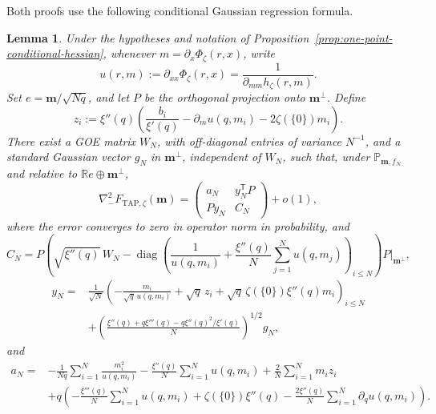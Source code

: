 \documentclass[a4paper,10pt,reqno]{amsart}
\numberwithin{equation}{section}
\newtheorem{lemma}[proposition]{Lemma}%
\newcommand{\dP}{\mathbb{P}}%
\newcommand{\TAP}{\mathrm{TAP}}
\newcommand{\bfm}{\mathbf{m}}
\begin{document}
	Both proofs use the following conditional Gaussian regression formula.
	
	\begin{lemma}
		\label{lem:one-point-gaussian-regression}
		Under the hypotheses and notation of
		Proposition~\ref{prop:one-point-conditional-hessian}, whenever
		\(m=\partial_x\Phi_\zeta(r,x)\), write
		\[
		u(r,m):=\partial_{xx}\Phi_\zeta(r,x)
		=\frac1{\partial_{mm}h_\zeta(r,m)}.
		\]
		Set \(e=\bfm/\sqrt{Nq}\), and let \(P\) be the orthogonal
		projection onto \(\bfm^\perp\). Define
		\[
		z_i
		:=
		\xi''(q)\left(
		\frac{b_i}{\xi'(q)}-\partial_m u(q,m_i)
		-2\zeta(\{0\})m_i
		\right).
		\]
		There exist a GOE matrix \(W_N\), with off-diagonal entries of
		variance \(N^{-1}\), and a standard Gaussian vector \(g_N\) in
		\(\bfm^\perp\), independent of \(W_N\), such that, under
		\(\dP_{\bfm,f_N}\) and relative to
		\(\mathbb R e\oplus\bfm^\perp\),
		\begin{equation}\label{eq:one-point-hessian-blocks}
			\nabla_-^2F_{\TAP,\zeta}(\bfm)
			=
			\begin{pmatrix}
				a_N&y_N^{\mathsf T}P\\
				Py_N&C_N
			\end{pmatrix}
			+o(1),
		\end{equation}
		where the error converges to zero in operator norm in probability,
		and
		\begin{equation}\label{eq:one-point-hessian-tangent-block}
			C_N
			=
			P\left(
			\sqrt{\xi''(q)}\,W_N
			-\operatorname{diag}\left(
			\frac1{u(q,m_i)}
			+\frac{\xi''(q)}N\sum_{j=1}^Nu(q,m_j)
			\right)_{i\le N}
			\right)P\big|_{\bfm^\perp},
		\end{equation}
		\[
		\begin{aligned}
			y_N={}&
			\frac1{\sqrt N}\left(
			-\frac{m_i}{\sqrt q\,u(q,m_i)}+\sqrt q\,z_i
			+\sqrt q\,\zeta(\{0\})\xi''(q)m_i
			\right)_{i\le N}\\
			&+\left(
			\frac{\xi''(q)+q\xi'''(q)-q\xi''(q)^2/\xi'(q)}N
			\right)^{1/2}g_N,
		\end{aligned}
		\]
		and
		\[
		\begin{aligned}
			a_N={}&
			-\frac1{Nq}\sum_{i=1}^N\frac{m_i^2}{u(q,m_i)}
			-\frac{\xi''(q)}N\sum_{i=1}^Nu(q,m_i)
			+\frac2N\sum_{i=1}^Nm_iz_i\\
			&+q\left(
			-\frac{\xi'''(q)}N\sum_{i=1}^Nu(q,m_i)
			+\zeta(\{0\})\xi''(q)
			-\frac{2\xi''(q)}N\sum_{i=1}^N\partial_q u(q,m_i)
			\right).
		\end{aligned}
		\]
	\end{lemma}
	
\end{document}
